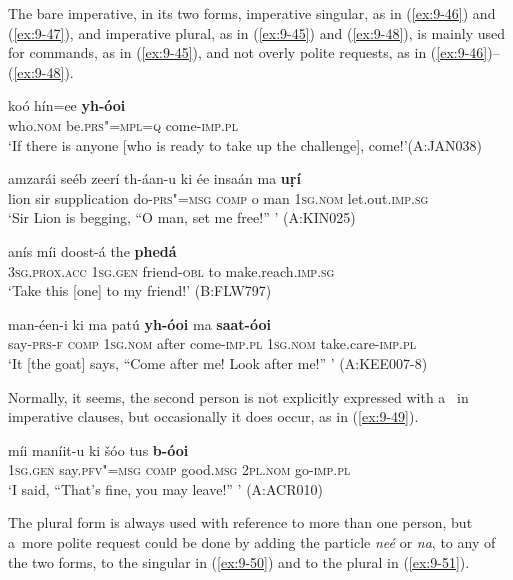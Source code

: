 The bare imperative, in its two forms, imperative singular, as in (\ref{ex:9-46}) and (\ref{ex:9-47}), and imperative plural, as in (\ref{ex:9-45}) and (\ref{ex:9-48}), is mainly used for commands, as in (\ref{ex:9-45}), and not overly polite requests, as in (\ref{ex:9-46})--(\ref{ex:9-48}).

\ea
\label{ex:9-45}
\gll koó hín=ee \textbf{yh-óoi}\\
who.\textsc{nom} be.\textsc{prs"=mpl=q} come-\textsc{imp.pl}\\
\glt `If there is anyone [who is ready to take up the challenge], come!'\newline (A:JAN038)

\ex
\label{ex:9-46}
\gll amzarái seéb zeerí th-áan-u ki ée insaán ma \textbf{uṛí}\\
lion sir supplication do-\textsc{prs"=msg} \textsc{comp} o man \textsc{1sg.nom} let.out.\textsc{imp.sg}\\
\glt `Sir Lion is begging, ``O man, set me free!'' ' (A:KIN025)

\ex
\label{ex:9-47}
\gll anís míi doost-á the \textbf{phedá} \\
\textsc{3sg.prox.acc} \textsc{1sg.gen} friend-\textsc{obl} to make.reach.\textsc{imp.sg}\\
\glt `Take this [one] to my friend!' (B:FLW797)

\ex
\label{ex:9-48}
\gll man-éen-i ki ma patú \textbf{yh-óoi} ma \textbf{saat-óoi} \\
say-\textsc{prs-f} \textsc{comp} \textsc{1sg.nom} after come-\textsc{imp.pl} \textsc{1sg.nom} take.care-\textsc{imp.pl} \\
\glt `It [the goat] says, ``Come after me! Look after me!'' ' (A:KEE007-8)
\z

Normally, it seems, the second person is not explicitly expressed with a~ in imperative clauses, but occasionally it does occur, as in (\ref{ex:9-49}).

\begin{exe}
\ex
\label{ex:9-49}
\gll míi maníit-u ki šóo tus \textbf{b-óoi} \\
\textsc{1sg.gen} say.\textsc{pfv"=msg} \textsc{comp} good.\textsc{msg} \textsc{2pl.nom} go-\textsc{imp.pl} \\
\glt `I said, ``That's fine, you may leave!'' ' (A:ACR010)
\end{exe}

The plural form is always used with reference to more than one person, but a~more polite request could be done by adding the particle \textit{neé} or \textit{na}, to any of the two forms, to the singular in (\ref{ex:9-50}) and to the plural in (\ref{ex:9-51}).

